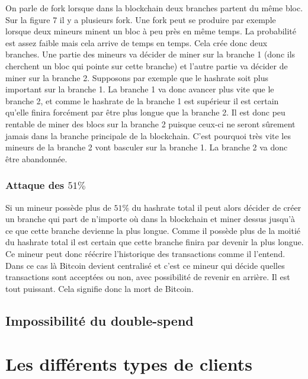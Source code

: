 \documentclass[11pt,a4paper]{article}
\begin{document}
On parle de fork lorsque dans la blockchain deux branches partent du même bloc. Sur la figure 7 il y a plusieurs fork. Une fork peut se produire par exemple lorsque deux mineurs minent un bloc à peu près en même temps. La probabilité est assez faible mais cela arrive de temps en temps. Cela crée donc deux branches. Une partie des mineurs va décider de miner sur la branche 1 (donc ils cherchent un bloc qui pointe sur cette branche) et l'autre partie va décider de miner sur la branche 2. Supposons par exemple que le hashrate soit plus important sur la branche 1. La branche 1 va donc avancer plus vite que le branche 2, et comme le hashrate de la branche 1 est supérieur il est certain qu'elle finira forcément par être plus longue que la branche 2. Il est donc peu rentable de miner des blocs sur la branche 2 puisque ceux-ci ne seront sûrement jamais dans la branche principale de la blockchain. C'est pourquoi très vite les mineurs de la branche 2 vont basculer sur la branche 1. La branche 2 va donc être abandonnée.

\subsubsection{Attaque des $51\%$}

Si un mineur possède plus de $51\%$ du hashrate total il peut alors décider de créer un branche qui part de n'importe où dans la blockchain et miner dessus jusqu'à ce que cette branche devienne la plus longue. Comme il possède plus de la moitié du hashrate total il est certain que cette branche finira par devenir la plus longue. Ce mineur peut donc réécrire l'historique des transactions comme il l'entend. Dans ce cas là Bitcoin devient centralisé et c'est ce mineur qui décide quelles transactions sont acceptées ou non, avec possibilité de revenir en arrière. Il est tout puissant. Cela signifie donc la mort de Bitcoin.


\subsection{Impossibilité du double-spend}


\section{Les différents types de clients}
\end{document}

